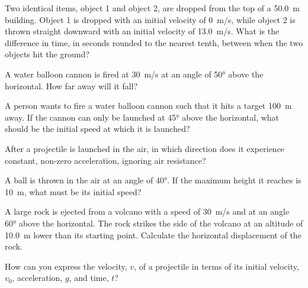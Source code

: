 \documentclass[dvipsnames]{article}
\numberwithin{equation}{section}
\numberwithin{figure}{section}
\begin{document}
\begin{exercise}  \label{agp59Z}
    Two identical items, object 1 and object 2, are dropped from the top of a \SI{50.0}{m} building. Object 1 is dropped with an initial velocity of \SI{0}{m/s}, while object 2 is thrown straight downward with an initial velocity of \SI{13.0}{m/s}. What is the difference in time, in seconds rounded to the nearest tenth, between when the two objects hit the ground?
\end{exercise}

\begin{exercise} \label{Xu3FK9}
    A water balloon cannon is fired at \SI{30}{m/s} at an angle of \ang{50} above the horizontal. How far away will it fall?
\end{exercise}

\begin{exercise} \label{piJ9kJ}
    A person wants to fire a water balloon cannon such that it hits a target \SI{100}{m} away. If the cannon can only be launched at \ang{45} above the horizontal, what should be the initial speed at which it is launched?
\end{exercise}

\begin{exercise} \label{sy5RGT}
    After a projectile is launched in the air, in which direction does it experience constant, non-zero acceleration, ignoring air resistance?
\end{exercise}

\begin{exercise} \label{N0Bwou}
    A ball is thrown in the air at an angle of \ang{40}. If the maximum height it reaches is \SI{10}{m}, what must be its initial speed?
\end{exercise}

\begin{exercise} \label{lhjg95}
    A large rock is ejected from a volcano with a speed of \SI{30}{m/s} and at an angle \ang{60} above the horizontal. The rock strikes the side of the volcano at an altitude of \SI{10.0}{m} lower than its starting point. Calculate the horizontal displacement of the rock.
\end{exercise}

\begin{exercise} \label{wlbvvu}
    How can you express the velocity, $v$, of a projectile in terms of its initial velocity, $v_0$, acceleration, $g$, and time, $t$?
\end{exercise}

\end{document}
